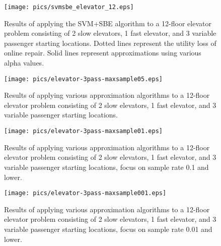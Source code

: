 \begin{figure}
\begin{center}
\texttt{[image: pics/svmsbe\_elevator\_12.eps]}
\caption{Results of applying the SVM+SBE algorithm to a 12-floor elevator problem consisting of 2 slow elevators, 1 fast elevator, and 3 variable passenger starting locations.  Dotted lines represent the utility loss of online repair.  Solid lines represent approximations using various alpha values.}
\label{fig:svmsbe_elevator_12}
\end{center}
\end{figure}




\begin{figure}
\begin{center}
\texttt{[image: pics/elevator-3pass-maxsample05.eps]}
\caption{Results of applying various approximation algorithms to a 12-floor elevator problem consisting of 2 slow elevators, 1 fast elevator, and 3 variable passenger starting locations.}
\label{fig:elevator-3pass-maxsample05}
\end{center}
\end{figure}

\begin{figure}
\begin{center}
\texttt{[image: pics/elevator-3pass-maxsample01.eps]}
\caption{Results of applying various approximation algorithms to a 12-floor elevator problem consisting of 2 slow elevators, 1 fast elevator, and 3 variable passenger starting locations, focus on sample rate 0.1 and lower.}
\label{fig:elevator-3pass-maxsample01}
\end{center}
\end{figure}

\begin{figure}
\begin{center}
\texttt{[image: pics/elevator-3pass-maxsample001.eps]}
\caption{Results of applying various approximation algorithms to a 12-floor elevator problem consisting of 2 slow elevators, 1 fast elevator, and 3 variable passenger starting locations, focus on sample rate 0.01 and lower.}
\label{fig:elevator-3pass-maxsample001}
\end{center}
\end{figure}





